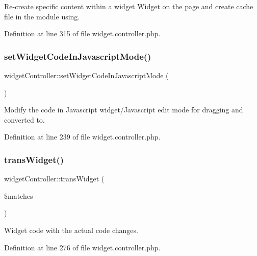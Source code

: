 Re-\/create specific content within a widget Widget on the page and create cache file in the module using. 



Definition at line 315 of file widget.\+controller.\+php.

\hypertarget{classwidgetController_a528aa6c73d47f9149cfe88528d28b5c7}{}\label{classwidgetController_a528aa6c73d47f9149cfe88528d28b5c7} 
\subsubsection{\texorpdfstring{set\+Widget\+Code\+In\+Javascript\+Mode()}{setWidgetCodeInJavascriptMode()}}
{\footnotesize\ttfamily widget\+Controller\+::set\+Widget\+Code\+In\+Javascript\+Mode (\begin{DoxyParamCaption}{ }\end{DoxyParamCaption})}



Modify the code in Javascript widget/\+Javascript edit mode for dragging and converted to. 



Definition at line 239 of file widget.\+controller.\+php.

\hypertarget{classwidgetController_ab83211452280836e73df5f7b6acdea82}{}\label{classwidgetController_ab83211452280836e73df5f7b6acdea82} 
\subsubsection{\texorpdfstring{trans\+Widget()}{transWidget()}}
{\footnotesize\ttfamily widget\+Controller\+::trans\+Widget (\begin{DoxyParamCaption}\item[{}]{\$matches }\end{DoxyParamCaption})}



Widget code with the actual code changes. 



Definition at line 276 of file widget.\+controller.\+php.

